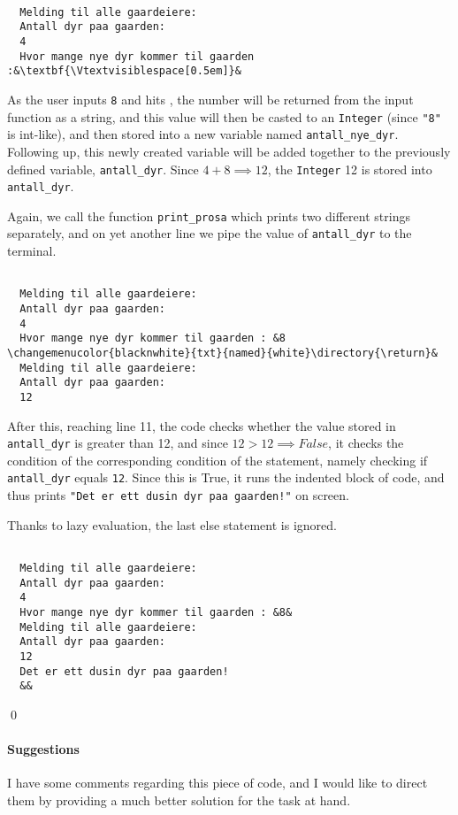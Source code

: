 \documentclass{assignment}
\newcommand\Vtextvisiblespace[1][.3em]{%
  \mbox{\kern.06em\vrule height.3ex}%
  \vbox{\hrule width#1}%
  \hbox{\vrule height.3ex}}
\begin{document}
\begin{lstlisting}[style=custombash]

  Melding til alle gaardeiere:
  Antall dyr paa gaarden: 
  4
  Hvor mange nye dyr kommer til gaarden :&\textbf{\Vtextvisiblespace[0.5em]}&
\end{lstlisting}

As the user inputs \texttt{8} and hits \keys{\return}, the number will be returned from the input function as a string, and this value will then be casted to an \texttt{Integer} (since \texttt{"8"} is int-like), and then stored into a new variable named \texttt{antall\_nye\_dyr}. Following up, this newly created variable will be added together to the previously defined variable, \texttt{antall\_dyr}. Since $4 + 8 \implies 12$, the \texttt{Integer} 12 is stored into \texttt{antall\_dyr}.

Again, we call the function \texttt{print\_prosa} which prints two different strings separately, and on yet another line we pipe the value of \texttt{antall\_dyr} to the terminal.

\begin{lstlisting}[style=custombash]

  Melding til alle gaardeiere:
  Antall dyr paa gaarden: 
  4
  Hvor mange nye dyr kommer til gaarden : &8 \changemenucolor{blacknwhite}{txt}{named}{white}\directory{\return}&
  Melding til alle gaardeiere:
  Antall dyr paa gaarden: 
  12
\end{lstlisting}

After this, reaching line 11, the code checks whether the value stored in \texttt{antall\_dyr} is greater than 12, and since $ 12 > 12 \implies False$, it checks the condition of the corresponding condition of the statement, namely checking if \texttt{antall\_dyr} equals \texttt{12}. Since this is True, it runs the indented block of code, and thus prints \texttt{"Det er ett dusin dyr paa gaarden!"} on screen.

Thanks to lazy evaluation, the last else statement is ignored.
\begin{lstlisting}[style=custombash]

  Melding til alle gaardeiere:
  Antall dyr paa gaarden: 
  4
  Hvor mange nye dyr kommer til gaarden : &8&
  Melding til alle gaardeiere:
  Antall dyr paa gaarden: 
  12
  Det er ett dusin dyr paa gaarden!
  &&
\end{lstlisting}
\qed

\paragraph{Suggestions} I have some comments regarding this piece of code, and I would like to direct them by providing a much better solution for the task at hand.
\end{document}
